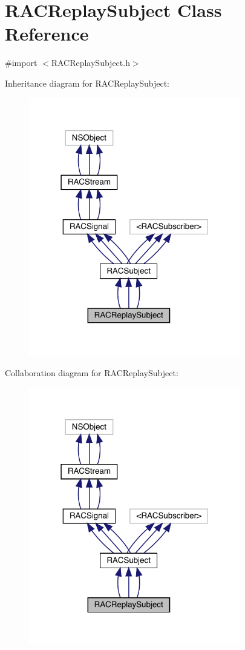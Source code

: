 \hypertarget{interface_r_a_c_replay_subject}{}\section{R\+A\+C\+Replay\+Subject Class Reference}
\label{interface_r_a_c_replay_subject}


{\ttfamily \#import $<$R\+A\+C\+Replay\+Subject.\+h$>$}



Inheritance diagram for R\+A\+C\+Replay\+Subject\+:\nopagebreak
\begin{figure}[H]
\begin{center}
\leavevmode
\includegraphics[width=262pt]{interface_r_a_c_replay_subject__inherit__graph}
\end{center}
\end{figure}


Collaboration diagram for R\+A\+C\+Replay\+Subject\+:\nopagebreak
\begin{figure}[H]
\begin{center}
\leavevmode
\includegraphics[width=262pt]{interface_r_a_c_replay_subject__coll__graph}
\end{center}
\end{figure}
